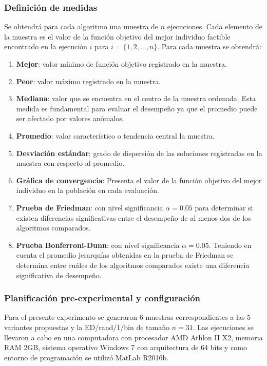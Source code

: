 \subsubsection{Definición de medidas}
Se obtendrá para cada algoritmo una muestra de $n$ ejecuciones. Cada elemento de la muestra es el valor de la función objetivo del mejor individuo factible encontrado en la ejecución $i$ para $i= \{ 1,2,...,n\}$. Para cada muestra se obtendrá:
\begin{enumerate}
	\item \textbf{Mejor}: valor mínimo de función objetivo registrado en la muestra.
	\item \textbf{Peor}: valor máximo registrado en la muestra.
	\item \textbf{Mediana}: valor que se encuentra en el centro de la muestra ordenada. Esta medida es fundamental para evaluar el desempeño ya que el promedio puede ser afectado por valores anómalos. 
	\item \textbf{Promedio}: valor característico o tendencia central la muestra.
	\item \textbf{Desviación estándar}: grado de dispersión de las soluciones registradas en la muestra con respecto al promedio.
	\item \textbf{Gráfica de convergencia}: Presenta el valor de la función objetivo del mejor individuo en la población en cada evaluación.
    \item \textbf{Prueba de Friedman}: con nivel significancia $\alpha=0.05$ para determinar si existen diferencias significativas entre el desempeño de al menos dos de los algoritmos comparados. 
	\item \textbf{Prueba Bonferroni-Dunn}: con nivel significancia $\alpha=0.05$. Teniendo en cuenta el promedio jerarquías obtenidas en la prueba de Friedman se determina entre cuáles de los algoritmos comparados existe una diferencia significativa de desempeño.     
\end{enumerate}
\subsubsection{Planificación pre-experimental y configuración}
Para el presente experimento se generaron 6 muestras correspondientes a las 5 variantes propuestas y la  ED/rand/1/bin de tamaño $n=31$. Las ejecuciones se llevaron a cabo en una computadora con procesador AMD Athlon II X2, memoria RAM 2GB, sistema operativo Windows 7 con arquitectura de 64 bits y como entorno de programación se utilizó  MatLab R2016b. 

